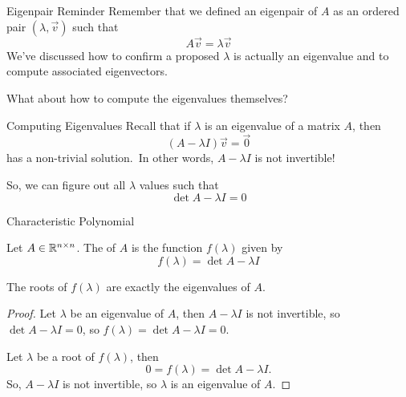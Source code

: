 \documentclass[xcoler=dvipsnames, aspectratio=169]{beamer}
\date{Characteristic Polynomial}
\begin{document}
    \begin{frame}{Eigenpair Reminder}
        Remember that we defined an eigenpair of $A$ as an ordered pair $(\lambda,\vec{v})$ such that
        \[
            A\vec{v} = \lambda\vec{v}
        \]\pause
        We've discussed how to confirm a proposed $\lambda$ is actually an eigenvalue and to compute
        associated eigenvectors.\pause\ 

        What about how to compute the eigenvalues themselves?
    \end{frame}
    \begin{frame}{Computing Eigenvalues}
        Recall that if $\lambda$ is an eigenvalue of a matrix $A$, then 
        \[
            (A-\lambda I)\vec{v} = \vec{0}
        \]
        has a non-trivial solution.\pause\ In other words, $A-\lambda I$ is not invertible!\pause\

        So, we can figure out all $\lambda$ values such that
        \[
            \det{A-\lambda I} = 0
        \]
    \end{frame}
    \begin{frame}{Characteristic Polynomial}
        \small
        \begin{defn}
            Let $A\in\mathbb{R}^{n\times n}$. The  of $A$ is the function
            $f(\lambda)$ given by
            \[
                f(\lambda) = \det{A-\lambda I}
            \]
        \end{defn}\pause
        \begin{theorem}
            The roots of $f(\lambda)$ are exactly the eigenvalues of $A$.
        \end{theorem}\pause
        \begin{proof}
            Let $\lambda$ be an eigenvalue of $A$, then $A-\lambda I$ is not invertible, so
            $\det{A-\lambda I}=0$, so $f(\lambda) = \det{A-\lambda I} = 0$.\pause\

            Let $\lambda$ be a root of $f(\lambda)$, then
            \[
                0 = f(\lambda) = \det{A-\lambda I}.
            \]
            So, $A-\lambda I$ is not invertible, so $\lambda$ is an eigenvalue of $A$.
        \end{proof}
    \end{frame}
\end{document}
